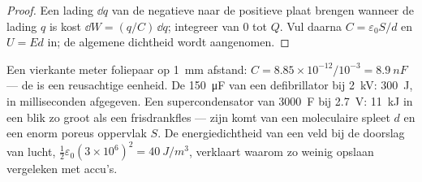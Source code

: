 \begin{proof}
Een lading $\dd q$ van de negatieve naar de positieve plaat brengen wanneer de lading
$q$ is kost $\dd W = (q/C)\,\dd q$; integreer van $0$ tot $Q$. Vul daarna
$C = \varepsilon_0S/d$ en $U = Ed$ in; de algemene dichtheid wordt aangenomen.
\end{proof}

\begin{example}\label{ex:b1:potential-capacitors:energies}
Een vierkante meter foliepaar op \qty{1}{mm} afstand: $C = 8.85 \times 10^{-12}/
10^{-3} = \qty{8.9}{nF}$ --- de  is een reusachtige eenheid. De
\qty{150}{\micro F} van een defibrillator bij \qty{2}{kV}: \qty{300}{J}, in milliseconden afgegeven.
Een supercondensator van \qty{3000}{F} bij \qty{2.7}{V}: \qty{11}{kJ} in een blik
zo groot als een frisdrankfles --- zijn  komt van een moleculaire
spleet $d$ en een enorm poreus oppervlak $S$. De energiedichtheid van een veld bij
de doorslag van lucht, $\tfrac12\varepsilon_0(3 \times 10^6)^2 = \qty{40}{J/m^3}$, verklaart
waarom  zo weinig opslaan vergeleken met accu's.
\end{example}

